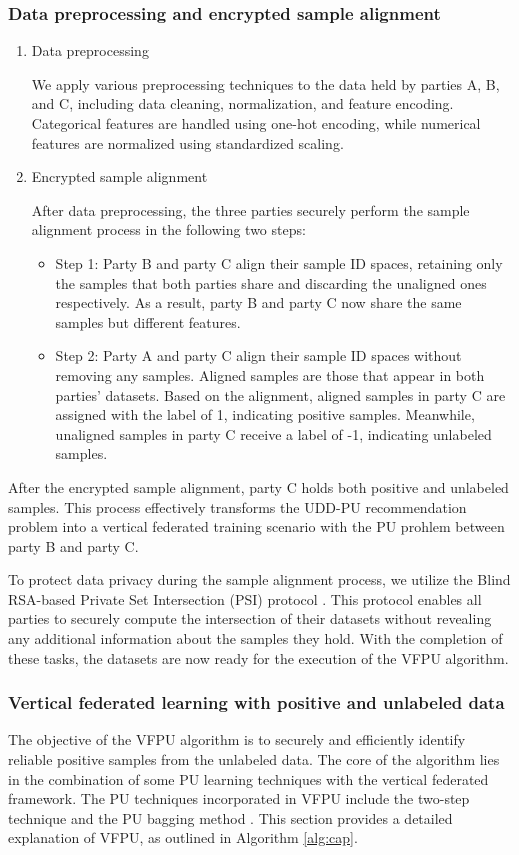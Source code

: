 \documentclass[10pt,journal,compsoc]{IEEEtran}
\begin{document}
\subsubsection{Data preprocessing and encrypted sample alignment}
\begin{enumerate}[label=(\arabic*)]
	\item Data preprocessing
	
	We apply various preprocessing techniques to the data held by parties A, B, and C, including data cleaning, normalization, and feature encoding. Categorical features are handled using one-hot encoding, while numerical features are normalized using standardized scaling.
	\item Encrypted sample alignment
	
	After data preprocessing, the three parties securely perform the sample alignment process in the following two steps:
	\begin{itemize}
		\item Step 1: Party B and party C align their sample ID spaces, retaining only the samples that both parties share and discarding the unaligned ones respectively. As a result, party B and party C now share the same samples but different features.
		\item Step 2: Party A and party C align their sample ID spaces without removing any samples. Aligned samples are those that appear in both parties’ datasets. Based on the alignment, aligned samples in party C are assigned with the label of 1, indicating positive samples. Meanwhile, unaligned samples in party C receive a label of -1, indicating unlabeled samples.
	\end{itemize}
\end{enumerate}


After the encrypted sample alignment, party C holds both positive and unlabeled samples. This process effectively transforms the UDD-PU recommendation problem into a vertical federated training scenario with the PU prohlem between party B and party C. 

To protect data privacy during the sample alignment process, we utilize the Blind RSA-based Private Set Intersection (PSI) protocol \cite{de2010practical}. This protocol enables all parties to securely compute the intersection of their datasets without revealing any additional information about the samples they hold. With the completion of these tasks, the datasets are now ready for the execution of the VFPU algorithm.

\subsubsection{Vertical federated learning with positive and unlabeled data}
The objective of the VFPU algorithm is to securely and efficiently identify reliable positive samples from the unlabeled data. The core of the algorithm lies in the combination of some PU learning techniques with the vertical federated framework. The PU techniques incorporated in VFPU include the two-step technique \cite{liu2003building} and the PU bagging method \cite{mordelet2014bagging}. This section provides a detailed explanation of VFPU, as outlined in Algorithm \ref{alg:cap}. 
\end{document}

